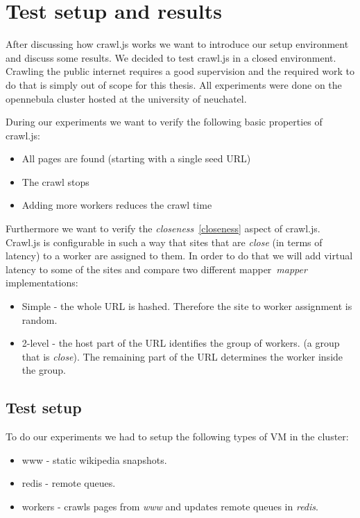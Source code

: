 
\chapter{Test setup and results} %

\label{Chapter5} %


After discussing how crawl.js works we want to introduce our setup environment and discuss some results. We decided to test crawl.js in a closed environment. Crawling the public internet requires a good supervision and the required work to do that is simply out of scope for this thesis. All experiments were done on the opennebula cluster hosted at the university of neuchatel.

During our experiments we want to verify the following basic properties of crawl.js:
\begin{itemize}
\item All pages are found (starting with a single seed URL)
\item The crawl stops
\item Adding more workers reduces the crawl time
\end{itemize}

Furthermore we want to verify the \emph{closeness}~\ref{closeness} aspect of crawl.js. Crawl.js is configurable in such a way that sites that are \emph{close} (in terms of latency) to a worker are assigned to them. In order to do that we will add virtual latency to some of the sites and compare two different mapper~\emph{mapper} implementations:
\begin{itemize}
\item Simple - the whole URL is hashed. Therefore the site to worker assignment is random.
\item 2-level - the host part of the URL identifies the group of workers. (a group that is \emph{close}). The remaining part of the URL determines the worker inside the group.
\end{itemize}

\section{Test setup}
To do our experiments we had to setup the following types of VM in the cluster:
\begin{itemize}
\item www - static wikipedia snapshots.
\item redis - remote queues.
\item workers - crawls pages from \emph{www} and updates remote queues in \emph{redis}.
\end{itemize}

